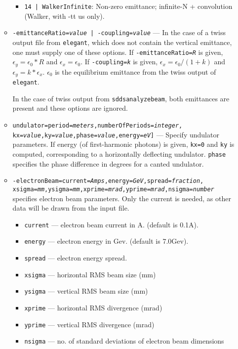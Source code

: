 \documentclass[11pt]{article}
\begin{document}
\begin{itemize}
\begin{itemize}
\begin{itemize}
    \item {\tt 14 | WalkerInfinite}:    Non-zero emittance; infinite-N + convolution (Walker, with {-tt us} only).
  \end{itemize}
\item {\tt -emittanceRatio={\em value} | -coupling={\em value}} --- In the case of a twiss
 output file from {\tt elegant}, which does not contain the vertical emittance, one must
 supply one of these options.  If {\tt -emittanceRatio={\em R}} is given, $\epsilon_y = \epsilon_0*R$ 
 and $\epsilon_x = \epsilon_0$. If {\tt -coupling={\em k}} is given, $\epsilon_x = \epsilon_0/(1+k)$
 and $\epsilon_y = k*\epsilon_x$.  $\epsilon_0$ is the equilibrium emittance from the twiss output
 of {\tt elegant}.  

 In the case of twiss output from {\tt sddsanalyzebeam}, both emittances are present and these options
 are ignored.
\item {\tt undulator=period={\em meters},numberOfPeriods={\em integer},}\\ {\tt kx={\em value},ky={\em value},phase={\em value},energy={\em eV}]} --- 
 Specify undulator parameters.  If energy (of first-harmonic photons) is given, {\tt kx=0} and {\tt ky} is computed,
 corresponding to a horizontally deflecting undulator.
 {\tt phase} specifies the phase difference in degrees for a canted undulator.  
\item {\tt -electronBeam=current={\em Amps},energy={\em GeV},spread={\em fraction},}\\ {\tt xsigma={\em mm},ysigma={\em mm},xprime={\em mrad},yprime={\em mrad},nsigma={\em number}} specifies electron beam parameters.  Only the current is needed, as other data will be drawn from the input file.
 \begin{itemize}
   \item {\tt current} ---  electron beam current in A. (default is 0.1A).
   \item {\tt energy} ---   electron energy in Gev. (default is 7.0Gev).
   \item {\tt spread} ---   electron energy spread.
   \item {\tt xsigma} ---   horizontal RMS beam size (mm)
   \item {\tt ysigma} ---   vertical RMS beam size (mm)
   \item {\tt xprime} ---   horizontal RMS divergence (mrad)
   \item {\tt yprime} ---   vertical RMS divergence (mrad)
   \item {\tt nsigma} ---   no. of standard deviations of electron beam dimensions

\end{itemize}
\end{itemize}
\end{itemize}
\end{document}

